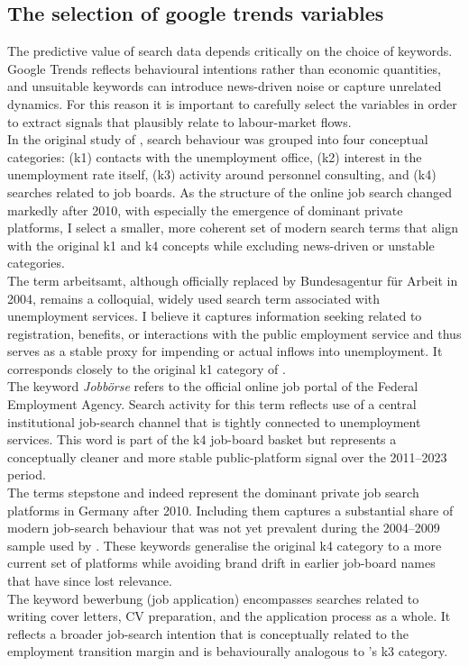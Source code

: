 \documentclass[12pt,a4paper]{article}
\begin{document}
\subsection{The selection of google trends variables}
The predictive value of search data depends critically on the choice of keywords. 
Google Trends reflects behavioural intentions rather than economic quantities, 
and unsuitable keywords can introduce news-driven noise or capture unrelated dynamics. 
For this reason it is important to carefully select the variables in order to extract signals that plausibly relate to labour-market flows. \\
In the original study of \citet{Askitas}, search behaviour was grouped into four 
conceptual categories: (k1) contacts with the unemployment office, 
(k2) interest in the unemployment rate itself, (k3) activity around personnel 
consulting, and (k4) searches related to job boards. 
As the structure of the online job search changed markedly after 2010, with especially
the emergence of dominant private platforms, I select a smaller, more coherent set of modern search terms that align with 
the original k1 and k4 concepts while excluding news-driven or unstable categories.\\
The term arbeitsamt, although officially replaced by 
Bundesagentur für Arbeit in 2004, remains a colloquial, widely used 
search term associated with unemployment services. I believe it captures information seeking related to registration, benefits, or 
interactions with the public employment service and thus serves as a stable proxy 
for impending or actual inflows into unemployment. 
It corresponds closely to the original k1 category of \citet{Askitas}.
\\The keyword \textit{Jobbörse} refers to the official online job portal of the Federal Employment Agency. 
Search activity for this term reflects use of a central institutional job-search 
channel that is tightly connected to unemployment services. This word is part of the k4 job-board basket but represents a 
conceptually cleaner and more stable public-platform signal over the 2011--2023 
period.\\
The terms stepstone and indeed represent the dominant private job 
search platforms in Germany after 2010. Including them captures a substantial share of modern job-search behaviour that 
was not yet prevalent during the 2004--2009 sample used by \citet{Askitas}. 
These keywords generalise the original k4 category to a more current set of 
platforms while avoiding brand drift in earlier job-board names that have since 
lost relevance.\\
The keyword bewerbung (job application) encompasses searches related to 
writing cover letters, CV preparation, and the application process as a whole. 
It reflects a broader job-search intention that is conceptually related to the 
employment transition margin and is behaviourally analogous to 
\citet{Askitas}'s k3 category.
\end{document}
